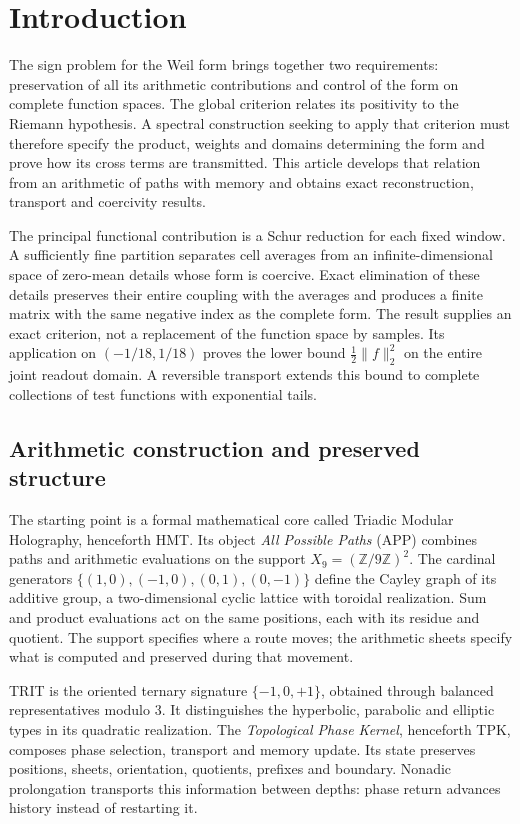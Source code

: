 \section{Introduction}

The sign problem for the Weil form brings together two
requirements: preservation of all its arithmetic contributions
and control of the form on complete function spaces. The global
criterion relates its positivity to the Riemann hypothesis.
A spectral construction seeking to apply that criterion must
therefore specify the product, weights and domains determining
the form and prove how its cross terms are transmitted. This
article develops that relation from an arithmetic of paths
with memory and obtains exact reconstruction, transport and
coercivity results.

The principal functional contribution is a Schur reduction for
each fixed window. A sufficiently fine partition separates
cell averages from an infinite-dimensional space of zero-mean
details whose form is coercive. Exact elimination of these
details preserves their entire coupling with the averages
and produces a finite matrix with the same negative index
as the complete form. The result supplies an exact criterion,
not a replacement of the function space by samples. Its
application on $(-1/18,1/18)$ proves the lower bound
$\frac12\|f\|_2^2$ on the entire joint readout domain.
A reversible transport extends this bound to complete
collections of test functions with exponential tails.

\subsection*{Arithmetic construction and preserved structure}

The starting point is a formal mathematical core called
Triadic Modular Holography, henceforth HMT. Its object
\emph{All Possible Paths} (APP) combines paths and arithmetic
evaluations on the support $X_9=(\mathbb Z/9\mathbb Z)^2$.
The cardinal generators $\{(1,0),(-1,0),(0,1),(0,-1)\}$
define the Cayley graph of its additive group, a
two-dimensional cyclic lattice with toroidal realization.
Sum and product evaluations act on the same positions,
each with its residue and quotient. The support specifies
where a route moves; the arithmetic sheets specify what
is computed and preserved during that movement.

TRIT is the oriented ternary signature $\{-1,0,+1\}$,
obtained through balanced representatives modulo $3$.
It distinguishes the hyperbolic, parabolic and elliptic
types in its quadratic realization. The
\emph{Topological Phase Kernel}, henceforth TPK, composes
phase selection, transport and memory update. Its state
preserves positions, sheets, orientation, quotients, prefixes
and boundary. Nonadic prolongation transports this
information between depths: phase return advances history
instead of restarting it.

